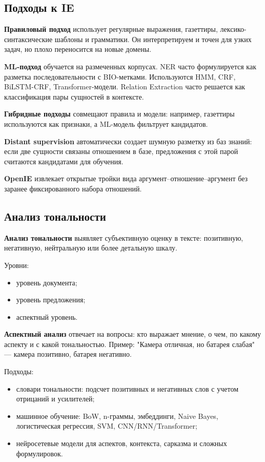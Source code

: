 \subsection*{Подходы к IE}

\textbf{Правиловый подход} использует регулярные выражения, газеттиры, лексико-синтаксические шаблоны и грамматики. Он интерпретируем и точен для узких задач, но плохо переносится на новые домены.

\textbf{ML-подход} обучается на размеченных корпусах. NER часто формулируется как разметка последовательности с BIO-метками. Используются HMM, CRF, BiLSTM-CRF, Transformer-модели. Relation Extraction часто решается как классификация пары сущностей в контексте.

\textbf{Гибридные подходы} совмещают правила и модели: например, газеттиры используются как признаки, а ML-модель фильтрует кандидатов.

\textbf{Distant supervision} автоматически создает шумную разметку из баз знаний: если две сущности связаны отношением в базе, предложения с этой парой считаются кандидатами для обучения.

\textbf{OpenIE} извлекает открытые тройки вида аргумент--отношение--аргумент без заранее фиксированного набора отношений.

\subsection*{Анализ тональности}

\textbf{Анализ тональности} выявляет субъективную оценку в тексте: позитивную, негативную, нейтральную или более детальную шкалу.

Уровни:
\begin{itemize}
    \item уровень документа;
    \item уровень предложения;
    \item аспектный уровень.
\end{itemize}

\textbf{Аспектный анализ} отвечает на вопросы: кто выражает мнение, о чем, по какому аспекту и с какой тональностью. Пример: "Камера отличная, но батарея слабая" --- камера позитивно, батарея негативно.

Подходы:
\begin{itemize}
    \item словари тональности: подсчет позитивных и негативных слов с учетом отрицаний и усилителей;
    \item машинное обучение: BoW, n-граммы, эмбеддинги, Naive Bayes, логистическая регрессия, SVM, CNN/RNN/Transformer;
    \item нейросетевые модели для аспектов, контекста, сарказма и сложных формулировок.
\end{itemize}


